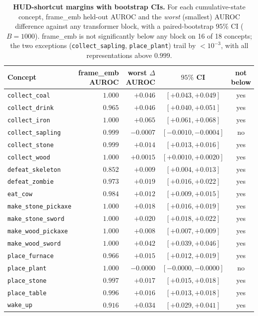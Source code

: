 \documentclass[11pt]{article}
\newcommand{\achname}[1]{\texttt{#1}}
\begin{document}
\begin{table}[h]
\centering
\caption{\textbf{HUD-shortcut margins with bootstrap CIs.} For each cumulative-state concept, \textsf{frame\_emb} held-out AUROC and the \emph{worst} (smallest) AUROC difference against any transformer block, with a paired-bootstrap $95\%$ CI ($B{=}1000$). \textsf{frame\_emb} is not significantly below any block on 16 of 18 concepts; the two exceptions (\achname{collect\_sapling}, \achname{place\_plant}) trail by $<10^{-3}$, with all representations above $0.999$.}\label{stab:hud}
\begin{tabular}{@{}lrrcc@{}}
\toprule
Concept & \textsf{frame\_emb} AUROC & worst $\Delta$AUROC & $95\%$ CI & not below \\
\midrule
\achname{collect\_coal}        & $1.000$ & $+0.046$ & $[+0.043,+0.049]$ & yes \\
\achname{collect\_drink}       & $0.965$ & $+0.046$ & $[+0.040,+0.051]$ & yes \\
\achname{collect\_iron}        & $1.000$ & $+0.065$ & $[+0.061,+0.068]$ & yes \\
\achname{collect\_sapling}     & $0.999$ & $-0.0007$ & $[-0.0010,-0.0004]$ & no \\
\achname{collect\_stone}       & $0.999$ & $+0.014$ & $[+0.013,+0.016]$ & yes \\
\achname{collect\_wood}        & $1.000$ & $+0.0015$ & $[+0.0010,+0.0020]$ & yes \\
\achname{defeat\_skeleton}     & $0.852$ & $+0.009$ & $[+0.004,+0.013]$ & yes \\
\achname{defeat\_zombie}       & $0.973$ & $+0.019$ & $[+0.016,+0.022]$ & yes \\
\achname{eat\_cow}             & $0.984$ & $+0.012$ & $[+0.009,+0.015]$ & yes \\
\achname{make\_stone\_pickaxe} & $1.000$ & $+0.018$ & $[+0.016,+0.019]$ & yes \\
\achname{make\_stone\_sword}   & $1.000$ & $+0.020$ & $[+0.018,+0.022]$ & yes \\
\achname{make\_wood\_pickaxe}  & $1.000$ & $+0.008$ & $[+0.007,+0.009]$ & yes \\
\achname{make\_wood\_sword}    & $1.000$ & $+0.042$ & $[+0.039,+0.046]$ & yes \\
\achname{place\_furnace}       & $0.966$ & $+0.015$ & $[+0.012,+0.019]$ & yes \\
\achname{place\_plant}         & $1.000$ & $-0.0000$ & $[-0.0000,-0.0000]$ & no \\
\achname{place\_stone}         & $0.997$ & $+0.017$ & $[+0.015,+0.018]$ & yes \\
\achname{place\_table}         & $0.996$ & $+0.016$ & $[+0.013,+0.018]$ & yes \\
\achname{wake\_up}             & $0.916$ & $+0.034$ & $[+0.029,+0.041]$ & yes \\
\bottomrule
\end{tabular}
\end{table}
\end{document}
